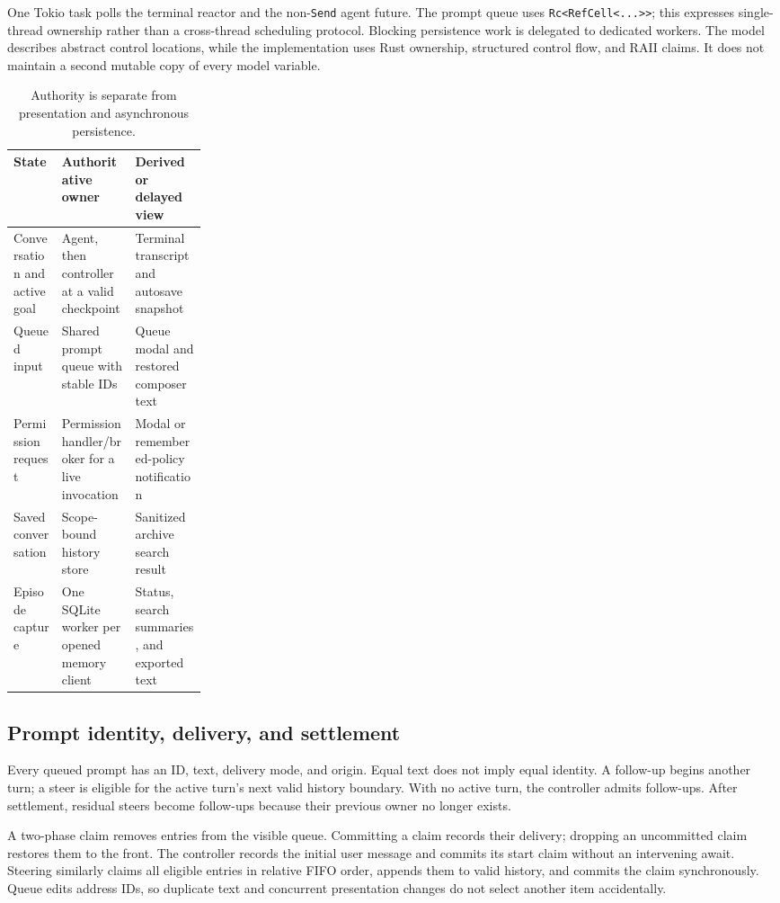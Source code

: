 \documentclass[10pt,letterpaper]{article}
\newcommand{\code}[1]{\texttt{#1}}
\begin{document}
One Tokio task polls the terminal reactor and the non-\code{Send} agent future.
The prompt queue uses \code{Rc<RefCell<...>>}; this expresses single-thread
ownership rather than a cross-thread scheduling protocol. Blocking persistence
work is delegated to dedicated workers. The model describes abstract control
locations, while the implementation uses Rust ownership, structured control
flow, and RAII claims. It does not maintain a second mutable copy of every
model variable.

\begin{table}[ht]
\small
\begin{tabularx}{\linewidth}{@{}p{0.25\linewidth}YY@{}}
\toprule
State & Authoritative owner & Derived or delayed view \\
\midrule
Conversation and active goal & Agent, then controller at a valid checkpoint & Terminal transcript and autosave snapshot \\
Queued input & Shared prompt queue with stable IDs & Queue modal and restored composer text \\
Permission request & Permission handler/broker for a live invocation & Modal or remembered-policy notification \\
Saved conversation & Scope-bound history store & Sanitized archive search result \\
Episode capture & One SQLite worker per opened memory client & Status, search summaries, and exported text \\
\bottomrule
\end{tabularx}
\caption{Authority is separate from presentation and asynchronous persistence.}
\end{table}

\subsection{Prompt identity, delivery, and settlement}
Every queued prompt has an ID, text, delivery mode, and origin. Equal text does
not imply equal identity. A follow-up begins another turn; a steer is eligible
for the active turn's next valid history boundary. With no active turn, the
controller admits follow-ups. After settlement, residual steers become
follow-ups because their previous owner no longer exists.

A two-phase claim removes entries from the visible queue. Committing a claim
records their delivery; dropping an uncommitted claim restores them to the
front. The controller records the initial user message and commits its start
claim without an intervening await. Steering similarly claims all eligible
entries in relative FIFO order, appends them to valid history, and commits the
claim synchronously. Queue edits address IDs, so duplicate text and concurrent
presentation changes do not select another item accidentally.
\end{document}
